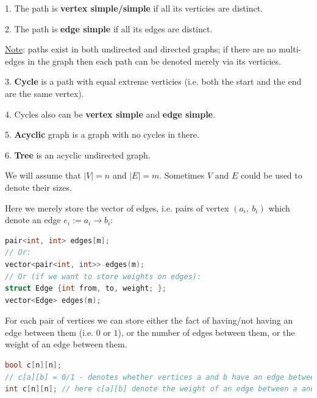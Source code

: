 \begin{definition}

    1. The path is \textbf{vertex simple/simple} if all its verticies are distinct.

    2. The path is \textbf{edge simple} if all its edges are distinct.

    \underline{Note}: paths exist in both undirected and directed graphs; if there are no multi-edges in the graph then each path can be denoted merely via its verticies.

    3. \textbf{Cycle} is a path with equal extreme verticies (i.e. both the start and the end are the same vertex).

    4. Cycles also can be \textbf{vertex simple} and \textbf{edge simple}.

    5. \textbf{Acyclic} graph is a graph with no cycles in there.

    6. \textbf{Tree} is an acyclic undirected graph.

\end{definition}



We will assume that $|V| = n$ and $|E| = m$. Sometimes $V$ and $E$ could be used to denote their sizes.


Here we merely store the vector of edges, i.e. pairs of vertex $(a_i,\ b_i)$ which denote an edge $e_i:= a_i \to b_i$:

\begin{lstlisting}[language=C++]
pair<int, int> edges[m];
// Or:
vector<pair<int, int>> edges(m);
// Or (if we want to store weights on edges):
struct Edge {int from, to, weight; };
vector<Edge> edges(m);
\end{lstlisting}


For each pair of vertices we can store either the fact of having/not having an edge between them (i.e. $0$ or $1$), or the number of edges between them, or the weight of an edge between them.

\begin{lstlisting}[language=C++]
bool c[n][n];
// c[a][b] = 0/1 - denotes whether vertices a and b have an edge between them
int c[n][n]; // here c[a][b] denote the weight of an edge between a and b
\end{lstlisting}


